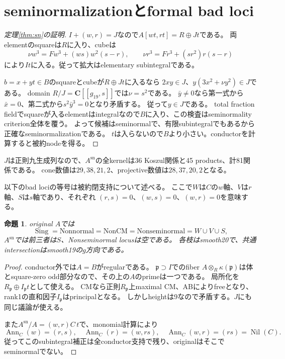 \documentclass[11pt,a4paper]{ltjsarticle}
\newcommand{\CC}{\mathbf C}
\newcommand{\sn}{\mathrm{sn}}
\newcommand{\Nil}{\operatorname{Nil}}
\newcommand{\Ann}{\operatorname{Ann}}
\newcommand{\Sing}{\operatorname{Sing}}
\newtheorem{proposition}[theorem]{命題}
\theoremstyle{definition}
\theoremstyle{remark}
\begin{document}
\section{seminormalizationとformal bad loci}

\begin{proof}[定理\ref{thm:sn}の証明]
$I+(w,r)=J$なので$A[wt,rt]=R\oplus Jt$である。
両elementのsquareは$R$に入り、cubeは
\[
 \nu w^3=Fw^3+(ws)w^2(s-r),\qquad
 \nu r^3=Fr^3+(sr^2)r(s-r)
\]
により$It$に入る。従って拡大はelementary subintegralである。

$b=x+yt\in B$のsquareとcubeが$R\oplus Jt$に入るなら
$2xy\in J$、$y(3x^2+\nu y^2)\in J$である。
domain $R/J=\CC[[g_{19},s]]$では$\nu=s^2$である。
$\bar y\ne0$なら第一式から$\bar x=0$、第二式から$s^2\bar y^3=0$となり矛盾する。
従って$y\in J$である。
total fraction fieldでsquareが入るelementはintegralなので$B$に入り、この検査はseminormality criterion全体を覆う。
よって候補はseminormalで、有限subintegralでもあるから正確なseminormalizationである。
$t$は入らないので$B$より小さい。conductorを計算すると被約nodeを得る。
\end{proof}

$J$は正則九生成列なので、$A^{\sn}$の全kernelは36 Koszul関係と45 products、計81関係である。
cone数値は$29,38,21,2$、projective数値は$28,37,20,2$となる。

以下のbad lociの等号は被約閉支持について述べる。
ここで$W$は$C$の$w$軸、$V$は$r$軸、$S$は$s$軸であり、それぞれ
$(r,s)=0$、$(w,s)=0$、$(w,r)=0$を意味する。
\begin{proposition}\label{prop:bad}
original $A$では
\[
 \Sing=\mathrm{Nonnormal}=\mathrm{NonCM}=\mathrm{Nonseminormal}
 =W\cup V\cup S,
\]
$A^{\sn}$では前三者は$S$、Nonseminormal locusは空である。
各枝はsmooth20で、共通intersectionはsmooth19の$g$方向である。
\end{proposition}
\begin{proof}
conductor外では$A=B$がregularである。
$\mathfrak p\supset I$でのfiber $A\otimes_R\kappa(\mathfrak p)$は体とsquare-zero odd部分なので、その上の$A$のprimeは一つである。
局所化を$R_{\mathfrak p}\oplus I_{\mathfrak p}t$として使える。
CMなら正則$R_{\mathfrak p}$上maximal CM、ABによりfreeとなり、rank1の直和因子$I_{\mathfrak p}$はprincipalとなる。
しかしheightは9なので矛盾する。$J$にも同じ議論が使える。

また$A^{\sn}/A=(w,r)C\,t$で、monomial計算により
\[
 \Ann_C(w)=(r,s),\quad\Ann_C(r)=(w,rs),\quad
 \Ann_C(w,r)=(rs)=\Nil(C).
\]
従ってこのsubintegral補正は全conductor支持で残り、originalはそこでseminormalでない。
\end{proof}
\end{document}
